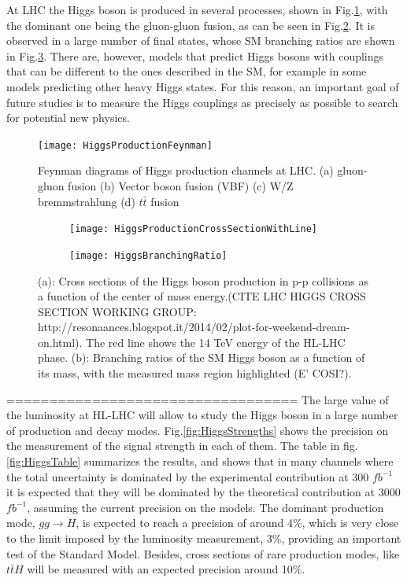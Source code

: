 \documentclass[a4paper,twoside,12pt]{article}
\begin{document}
At LHC the Higgs boson is produced in several processes, shown in Fig.\ref{fig:HiggsProductionFeynman}, with
the dominant one being the gluon-gluon fusion, as can be seen in Fig.\ref{fig:HiggsProductionCrossSection}. It is observed
in a large number of final states, whose SM branching ratios are shown in Fig.\ref{fig:HiggsBranchingRatio}. There are, however, models that
predict Higgs bosons with couplings that can be different to the ones described in the
SM, for example in some models predicting other heavy Higgs states. For this reason, an important goal of future studies is
to measure the Higgs couplings as precisely as possible to search for potential new physics. \\

\begin{figure} [h]
	\centering
	\texttt{[image: HiggsProductionFeynman]}
	\caption{Feynman diagrams of Higgs production channels at LHC\cite{HiggsFeynman}. (a) gluon-gluon fusion (b) Vector boson fusion (VBF) (c) W/Z bremmstrahlung (d) $t\bar{t}$ fusion}
	\label{fig:HiggsProductionFeynman}
\end{figure}


\begin{figure}
\centering
\begin{subfigure}{.5\textwidth}
  \centering
  \texttt{[image: HiggsProductionCrossSectionWithLine]}
  \caption{}
  \label{fig:HiggsProductionCrossSection}
\end{subfigure}%
\begin{subfigure}{.5\textwidth}
  \centering
  \texttt{[image: HiggsBranchingRatio]}
  \caption{}
  \label{fig:HiggsBranchingRatio}
\end{subfigure}
\caption{(a): Cross sections of the Higgs boson production in p-p collisions as a function of the center of mass energy.(CITE LHC HIGGS CROSS SECTION WORKING GROUP: http://resonaances.blogspot.it/2014/02/plot-for-weekend-dream-on.html). The red line
shows the 14 TeV energy of the HL-LHC phase. (b): Branching
ratios of the SM Higgs boson as a function of its mass, with the measured mass region highlighted (E' COSI?).}
\label{fig:test}
\end{figure}

==================================
The large value of the luminosity at HL-LHC will allow to study the Higgs boson in a large number of
production and decay modes. Fig.\ref{fig:HiggsStrengths} shows the precision on the measurement
of the signal strength in each of them. The table in fig.\ref{fig:HiggsTable} summarizes
the results, and shows that in many channels where the total uncertainty is
dominated by the experimental contribution at 300 $fb^{-1}$ it is expected that 
they will be dominated by
the theoretical contribution at 3000 $fb^{-1}$, assuming the current precision on
the models. The dominant production mode, $gg \rightarrow H$, is expected to reach
a precision of around 4\%, which is very close to the limit imposed by the luminosity 
measurement, 3\%, providing an important test of the Standard Model. Besides, cross
sections of rare production modes, like $t\bar{t}H$ will be
measured with an expected precision around 10\%.  \\
\end{document}
